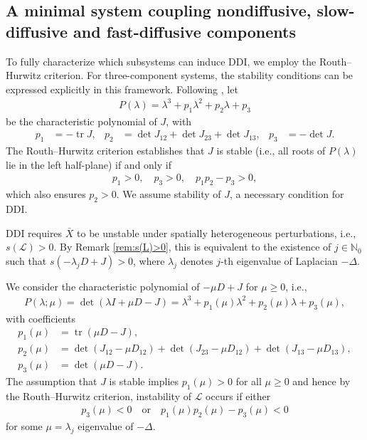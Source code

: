 \documentclass[12pt, a4paper]{amsart}
\numberwithin{equation}{section}
\newcommand{\CSS}{\bar{X}}
\renewcommand{\L}{{\mathcal{L}}}
\DeclareMathOperator{\tr}{tr}
\begin{document}
\subsection{A minimal system coupling nondiffusive, slow-diffusive and fast-diffusive components}\label{sec:special_case} 



To fully characterize which subsystems can induce DDI, we employ the Routh--Hurwitz criterion. For three-component systems, the stability conditions can be expressed explicitly in this
framework. Following \cite{Sakamoto12}, let
\begin{align}
    P(\lambda) = \lambda^3 + p_1 \lambda^2 + p_2 \lambda + p_3
\end{align}
be the characteristic polynomial of $J$, with
\begin{align}\label{eq:p1_p2_p3}
p_1 &= -\tr J, &
p_2 &= \det J_{12} + \det J_{23} + \det J_{13}, &
p_3 &= -\det J.
\end{align}
The Routh--Hurwitz criterion establishes that $J$ is stable (i.e., all roots of $P(\lambda)$ lie in the left half-plane) if and only if
\begin{align*}
    p_1 > 0, \quad p_3 > 0, \quad p_1p_2 - p_3 > 0,
\end{align*}
which also ensures $p_2 > 0$. We assume stability of $J$, a necessary condition for DDI.

DDI requires $\CSS$ to be unstable under spatially heterogeneous perturbations, i.e., $s(\L) > 0$. 
By Remark \ref{rem:s(L)>0}, this is equivalent to the existence of $j\in \mathbb{N}_0$ such that $s(- \lambda_j D + J) > 0$, where $\lambda_j$ denotes $j$-th eigenvalue of Laplacian $-\Delta$. 

We consider the characteristic polynomial of $-\mu D + J$ for $\mu\geqslant 0$, i.e.,
\begin{align}\label{eq:CharactPoly_-muD+J}
    P(\lambda; \mu) = \det(\lambda I + \mu D - J) = \lambda^3 + p_1(\mu) \lambda^2 + p_2(\mu) \lambda + p_3(\mu),
\end{align}
with coefficients
\begin{align*}
    p_1(\mu) &= \tr(\mu D - J),\\
    p_2(\mu) &= \det(J_{12} - \mu D_{12}) + \det(J_{23} - \mu D_{12}) + \det(J_{13} - \mu D_{13}),\\
    p_3(\mu) &= \det(\mu D - J).
\end{align*}
The assumption that $J$ is stable implies $p_1(\mu) > 0$ for all $\mu \geqslant 0$ and hence by the Routh--Hurwitz criterion, instability of $\L$ occurs if either
\begin{align}\label{eq:Routh-Hurwitz_criterion}
    p_3(\mu) < 0 \quad\text{or}\quad p_1(\mu)p_2(\mu) - p_3(\mu) < 0
\end{align}
for some $\mu=\lambda_j$ eigenvalue of $-\Delta$. 
\end{document}
